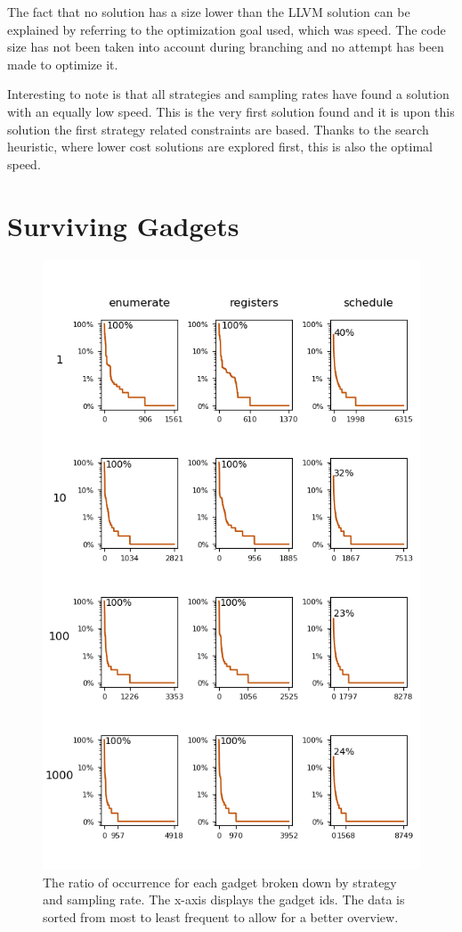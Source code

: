 The fact that no solution has a size lower than the LLVM solution can be explained by
referring to the optimization goal used, which was speed. The code size has not been taken
into account during branching and no attempt has been made to optimize it.

Interesting to note is that all strategies and sampling rates have found a solution with
an equally low speed. This is the very first solution found and it is upon this solution
the first strategy related constraints are based. Thanks to the search heuristic, where
lower cost solutions are explored first, this is also the optimal speed.

\section{Surviving Gadgets}

\begin{figure}[htp]
	\centering
	\includegraphics[width=\textwidth,height=0.9\textheight]{results/figures/gadgets}
	\caption{\small The ratio of occurrence for each gadget broken down by strategy and sampling rate.
The x-axis displays the gadget ids. The data is sorted from most to least frequent to allow
for a better overview.}
	\label{fig:gadgets}
\end{figure}

